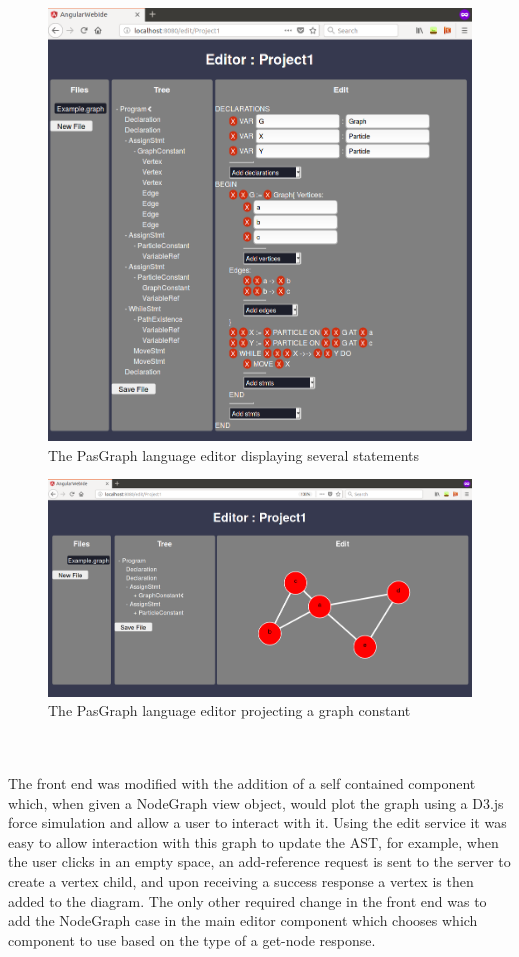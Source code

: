 \documentclass{article}
\begin{document}
{\begin{figure}[h!]
  \includegraphics[width=\linewidth]{./Screenshots/graphUI25Narrow.png}
  \caption{The PasGraph language editor displaying several statements}
  \label{fig:pasgraphUI1}
\end{figure}
\begin{figure}[h!]
  \centering
  \includegraphics[width=\linewidth]{./Screenshots/graphUIgraph2narrow.png}
  \caption{The PasGraph language editor projecting a graph constant}
  \label{fig:pasgraphUI2}
\end{figure}
\\
\\
The front end was modified with the addition of a self contained component which, when given a NodeGraph view object, would plot the graph using a D3.js force simulation and allow a user to interact with it. Using the edit service it was easy to allow interaction with this graph to update the AST, for example, when the user clicks in an empty space, an add-reference request is sent to the server to create a vertex child, and upon receiving a success response a vertex is then added to the diagram. The only other required change in the front end was to add the NodeGraph case in the main editor component which chooses which component to use based on the type of a get-node response.
}
\end{document}
